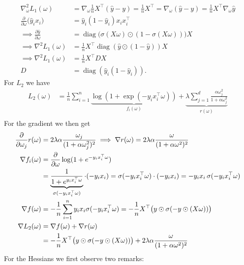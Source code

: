 \documentclass{article}
\begin{document}
\begin{align*}
\nabla^2 _\omega L_1(\omega) &= \nabla_\omega \frac{1}{n} X^\top (\hat{y} - y) 
= \frac{1}{n} X^\top  
= \nabla _\omega (\hat{y}-y)
= \frac{1}{n} X^\top  \nabla _\omega \hat{y} \\
%
\frac{\partial}{\partial \omega} \big( \hat{y}_i x_i \big) 
&= \hat{y}_i (1 - \hat{y}_i) x_i x_i^\top\\
%
\implies \frac{\partial \hat{y}}{\partial \omega} &= \operatorname{diag}\bigl(\sigma(X\omega) \odot (1 - \sigma(X\omega))\bigr) X \\
%
\implies \nabla^2 L_1(\omega) &= \frac{1}{n} X^\top \operatorname{diag}(\hat{y} \odot (1 - \hat{y})) X \\
%
\implies \nabla^2 L_1(\omega) &= \frac{1}{n} X^\top D X\\
D &= \operatorname{diag}(\hat{y}_i (1 - \hat{y}_i)).
\end{align*}
For $L_2$ we have
\begin{align*}
L_2(\omega) &= \frac{1}{n} \sum_{i=1}^n \underbrace{\log \left(1 + \exp(-y_i x_i^\top \omega)\right) }_{f_i(\omega)} + \underbrace{\lambda \sum_{j=1}^d \frac{\alpha \omega_j^2}{1 + \alpha \omega_j^2}}_{r(\omega)} \\
\end{align*}
For the gradient we then get
\begin{align*}
\frac{\partial}{\partial \omega_j} r(\omega) &= 2 \lambda \alpha \frac{\omega_j}{(1 + \alpha \omega_j^2)^2}
 \implies \nabla r(\omega) = 2 \lambda \alpha \frac{\omega}{(1 + \alpha \omega^2)^2} \\
%
\nabla f_i(\omega) &= \frac{\partial}{\partial \omega} \log(1 + e^{-y_i x_i^\top \omega}) \notag \\
&= \underbrace{\frac{1}{1 + e^{y_i x_i^\top \omega}}}_{\sigma(-y_i x_i^\top \omega)} \cdot (-y_i x_i) = \sigma(-y_i x_i^\top \omega) \cdot (-y_i x_i) = -y_i x_i \, \sigma(-y_i x_i^\top \omega) \notag\\
%
\nabla f(\omega) &= -\frac{1}{n} \sum_{i=1}^n y_i x_i \sigma(-y_i x_i^\top \omega) = -\frac{1}{n} X^\top \big(y \odot \sigma(-y \odot (X \omega))\big) \\
\nabla L_2(\omega) &= \nabla f(\omega) + \nabla r(\omega) \notag \\
 &= -\frac{1}{n} X^\top \big(y \odot \sigma(-y \odot (X \omega))\big) + 2 \lambda \alpha \frac{\omega}{(1 + \alpha \omega^2)^2}
\end{align*}
For the Hessians we first observe two remarks:\\
\end{document}

